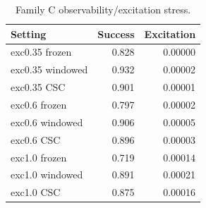 \begin{table}[t]
\caption{Family C observability/excitation stress.}
\label{tab:observability}
\centering
\begin{tabular}{lrr}
\toprule
Setting & Success & Excitation \\
\midrule
exc0.35 frozen & 0.828 & 0.00000 \\
exc0.35 windowed & 0.932 & 0.00002 \\
exc0.35 CSC & 0.901 & 0.00001 \\
exc0.6 frozen & 0.797 & 0.00002 \\
exc0.6 windowed & 0.906 & 0.00005 \\
exc0.6 CSC & 0.896 & 0.00003 \\
exc1.0 frozen & 0.719 & 0.00014 \\
exc1.0 windowed & 0.891 & 0.00021 \\
exc1.0 CSC & 0.875 & 0.00016 \\
\bottomrule
\end{tabular}
\end{table}
